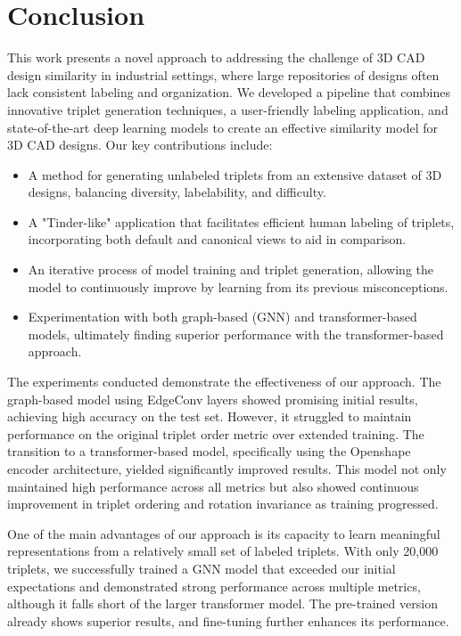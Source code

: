 \chapter*{Conclusion}
\label{sec:conclusion}

This work presents a novel approach to addressing the challenge of 3D CAD design similarity in industrial settings, where large repositories of designs often lack consistent labeling and organization. We developed a pipeline that combines innovative triplet generation techniques, a user-friendly labeling application, and state-of-the-art deep learning models to create an effective similarity model for 3D CAD designs.
Our key contributions include:


\begin{itemize}
    \item A method for generating unlabeled triplets from an extensive dataset of 3D designs, balancing diversity, labelability, and difficulty.
    \item A "Tinder-like" application that facilitates efficient human labeling of triplets, incorporating both default and canonical views to aid in comparison.
    \item An iterative process of model training and triplet generation, allowing the model to continuously improve by learning from its previous misconceptions.
    \item Experimentation with both graph-based (GNN) and transformer-based models, ultimately finding superior performance with the transformer-based approach.
\end{itemize}

The experiments conducted demonstrate the effectiveness of our approach. The graph-based model using EdgeConv layers showed promising initial results, achieving high accuracy on the test set. However, it struggled to maintain performance on the original triplet order metric over extended training. The transition to a transformer-based model, specifically using the Openshape encoder architecture, yielded significantly improved results. This model not only maintained high performance across all metrics but also showed continuous improvement in triplet ordering and rotation invariance as training progressed.

One of the main advantages of our approach is its capacity to learn meaningful representations from a relatively small set of labeled triplets. With only 20,000 triplets, we successfully trained a GNN model that exceeded our initial expectations and demonstrated strong performance across multiple metrics, although it falls short of the larger transformer model. The pre-trained version already shows superior results, and fine-tuning further enhances its performance.

